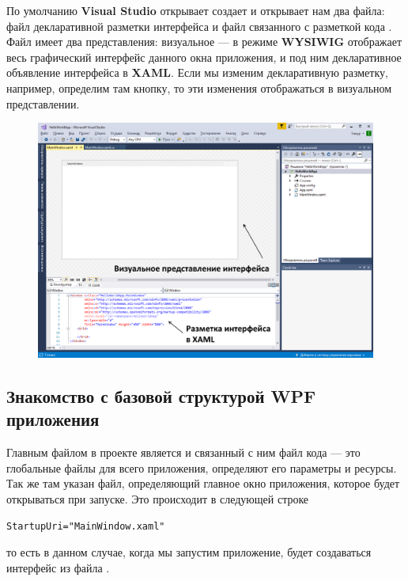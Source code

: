 \newpage
По умолчанию \textbf{Visual Studio} открывает создает и открывает нам два файла: файл декларативной разметки интерфейса  и файл связанного с разметкой кода . Файл  имеет два представления: визуальное — в режиме \textbf{WYSIWIG} отображает весь графический интерфейс данного окна приложения, и под ним декларативное объявление интерфейса в \textbf{XAML}. Если мы изменим декларативную разметку, например, определим там кнопку, то эти изменения отображаться в визуальном представлении.

\begin{figure}[H]
\centering
\includegraphics[width=1\textwidth]{introduction_project.png}
\end{figure}

\newpage
\subsection{Знакомство с базовой структурой WPF приложения}

Главным файлом в проекте является  и связанный с ним файл кода  — это глобальные файлы для всего приложения, определяют его параметры и ресурсы. Так же там указан файл, определяющий главное окно приложения, которое будет открываться при запуске. Это происходит в следующей строке

\begin{verbatim}
StartupUri="MainWindow.xaml"
\end{verbatim}

то есть в данном случае, когда мы запустим приложение, будет создаваться интерфейс из файла . 

